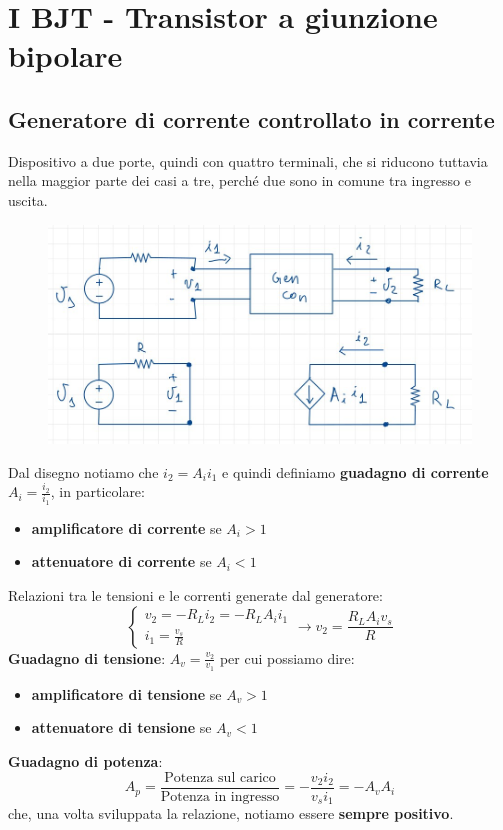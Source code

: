 \documentclass[11pt,a4paper,]{article}
\begin{document}
\section{I BJT - Transistor a giunzione bipolare}

\subsection{Generatore di corrente controllato in corrente}
\begin{definizione}
    Dispositivo a due porte, quindi con quattro terminali, che si riducono tuttavia nella maggior parte dei casi a tre, perché due sono in comune tra ingresso e uscita.
\end{definizione}
\begin{figure}[H]
    \centering
    \includegraphics[width=0.5\linewidth]{img/gen cor contr cor.png}
\end{figure}
Dal disegno notiamo che $i_2=A_ii_1$ e quindi definiamo \textbf{guadagno di corrente} $A_i=\frac{i_2}{i_1}$, in particolare:
\begin{itemize}
    \item \textbf{amplificatore di corrente} se $A_i > 1$
    \item \textbf{attenuatore di corrente} se $A_i < 1$
\end{itemize}
Relazioni tra le tensioni e le correnti generate dal generatore:
\[
\begin{cases}
v_2 = -R_L i_2 = -R_L A_i i_1 \\
i_1 = \frac{v_s}{R}
\end{cases}
\to v_2 = \frac{R_L A_i v_s}{R}
\]
\textbf{Guadagno di tensione}: $A_v=\frac{v_2}{v_1}$ per cui possiamo dire:
\begin{itemize}
    \item \textbf{amplificatore di tensione} se $A_v > 1$
    \item \textbf{attenuatore di tensione} se $A_v < 1$
\end{itemize}
\textbf{Guadagno di potenza}:
\[
A_p = \frac{\text{Potenza sul carico}}{\text{Potenza in ingresso}} = -\frac{v_2 i_2}{v_s i_1} = -A_v A_i
\]
che, una volta sviluppata la relazione, notiamo essere \textbf{sempre positivo}.
\end{document}
